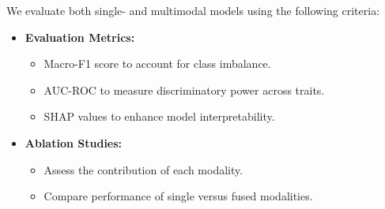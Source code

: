 We evaluate both single- and multimodal models using the following criteria:

\begin{itemize}
	\item \textbf{Evaluation Metrics:}
	\begin{itemize}
		\item Macro-F1 score to account for class imbalance.
		\item AUC-ROC to measure discriminatory power across traits.
		\item SHAP values to enhance model interpretability.
	\end{itemize}
	
	\item \textbf{Ablation Studies:}
	\begin{itemize}
		\item Assess the contribution of each modality.
		\item Compare performance of single versus fused modalities.
	\end{itemize}
\end{itemize}
